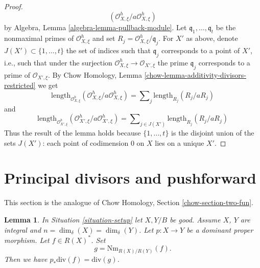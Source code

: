 \documentclass{stacks-project}
\theoremstyle{plain}
\newtheorem{lemma}[subsection]{Lemma}
\theoremstyle{definition}
\theoremstyle{remark}
\numberwithin{equation}{subsection}
\begin{document}
\begin{proof}
$$(\mathcal{O}_{X, \xi}^h/a \mathcal{O}_{X, \xi}^h)
$$
by Algebra, Lemma \ref{algebra-lemma-pullback-module}.
Let $\mathfrak q_1, \ldots, \mathfrak q_t$ be the nonmaximal
primes of $\mathcal{O}_{X, \xi}^h$ and set
$R_j = \mathcal{O}_{X, \xi}^h/\mathfrak q_j$.
For $X'$ as above, denote $J(X') \subset \{1, \ldots, t\}$
the set of indices such that $\mathfrak q_j$ corresponds
to a point of $X'$, i.e., such that under the surjection
$\mathcal{O}_{X, \xi}^h \to \mathcal{O}_{X', \xi}$
the prime $\mathfrak q_j$ corresponds to a prime
of $\mathcal{O}_{X', \xi}$.
By Chow Homology, Lemma \ref{chow-lemma-additivity-divisors-restricted}
we get
$$
\text{length}_{\mathcal{O}_{X, \xi}^h}
(\mathcal{O}_{X, \xi}^h/a \mathcal{O}_{X, \xi}^h) =
\sum\nolimits_j \text{length}_{R_j}(R_j/a R_j)
$$
and
$$
\text{length}_{\mathcal{O}_{X', \xi}^h}
(\mathcal{O}_{X', \xi}^h/a \mathcal{O}_{X', \xi}^h) =
\sum\nolimits_{j \in J(X')} \text{length}_{R_j}(R_j/a R_j)
$$
Thus the result of the lemma holds because
$\{1, \ldots, t\}$ is the disjoint union of the sets $J(X')$:
each point of codimension $0$ on $X$ lies on a unique $X'$.
\end{proof}







\section{Principal divisors and pushforward}
\label{section-two-fun}

\noindent
This section is the analogue of
Chow Homology, Section \ref{chow-section-two-fun}.

\begin{lemma}
\label{lemma-proper-pushforward-alteration}
In Situation \ref{situation-setup} let $X, Y/B$ be good.
Assume $X$, $Y$ are integral and $n = \dim_\delta(X) = \dim_\delta(Y)$.
Let $p : X \to Y$ be a dominant proper morphism.
Let $f \in R(X)^*$. Set
$$
g = \text{Nm}_{R(X)/R(Y)}(f).
$$
Then we have
$p_*\text{div}(f) = \text{div}(g)$.
\end{lemma}
\end{document}
